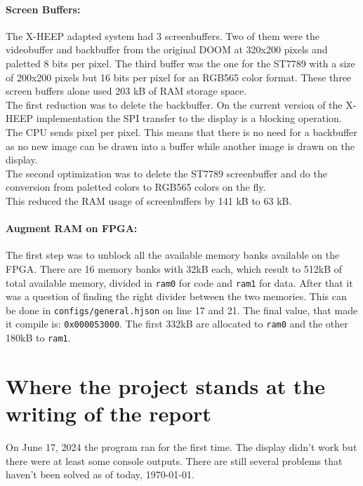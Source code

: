\paragraph{Screen Buffers:} The X-HEEP adapted system had 3 screenbuffers. Two of them were the videobuffer and backbuffer from the original DOOM at 320x200 pixels and paletted 8 bits per pixel. The third buffer was the one for the ST7789 with a size of 200x200 pixels but 16 bits per pixel for an RGB565 color format. These three screen buffers alone used 203 kB of RAM storage space. \\
The first reduction was to delete the backbuffer. On the current version of the X-HEEP implementation the SPI transfer to the display is a blocking operation. The CPU sends pixel per pixel. This means that there is no need for a backbuffer as no new image can be drawn into a buffer while another image is drawn on the display. \\
The second optimization was to delete the ST7789 screenbuffer and do the conversion from paletted colors to RGB565 colors on the fly. \\
This reduced the RAM usage of screenbuffers by 141 kB to 63 kB.


\paragraph{Augment RAM on FPGA:} The first step was to unblock all the available memory banks available on the FPGA. There are 16 memory banks with 32kB each, which result to 512kB of total available memory, divided in \texttt{ram0} for code and \texttt{ram1} for data. After that it was a question of finding the right divider between the two memories. This can be done in \texttt{configs/general.hjson} on line 17 and 21. The final value, that made it compile is: \texttt{0x000053000}. The first 332kB are allocated to \texttt{ram0} and the other 180kB to \texttt{ram1}.

\newpage

\section{Where the project stands at the writing of the report}

On June 17, 2024 the program ran for the first time. The display didn't work but there were at least some console outputs. There are still several problems that haven't been solved as of today, \today.

